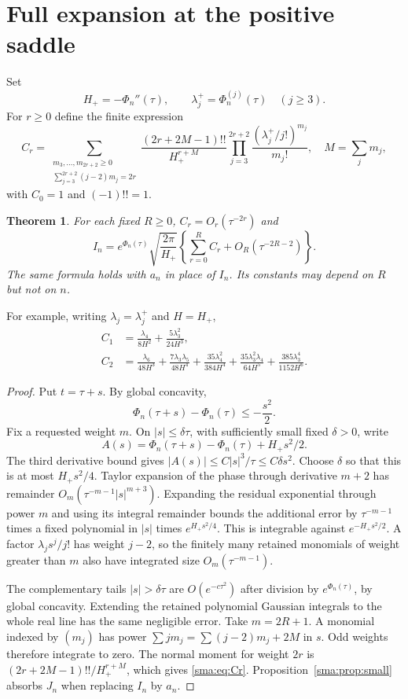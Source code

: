 \documentclass[11pt,letterpaper]{article}
\numberwithin{equation}{section}
\newtheorem{theorem}{Theorem}[section]\newtheorem{lemma}[theorem]{Lemma}\newtheorem{proposition}[theorem]{Proposition}\newtheorem{corollary}[theorem]{Corollary}\theoremstyle{remark}\newtheorem{remark}[theorem]{Remark}
\begin{document}
\section{Full expansion at the positive saddle}
Set
\[
 H_+=-\Phi_n''(\tau),\qquad \lambda_j^+=\Phi_n^{(j)}(\tau)\quad(j\ge3).
\]
For $r\ge0$ define the finite expression
\begin{equation}\label{sma:eq:Cr}
 C_r=\sum_{\substack{m_3,\ldots,m_{2r+2}\ge0\\
                  \sum_{j=3}^{2r+2}(j-2)m_j=2r}}
 \frac{(2r+2M-1)!!}{H_+^{r+M}}
 \prod_{j=3}^{2r+2}\frac{(\lambda_j^+/j!)^{m_j}}{m_j!},
 \quad M=\sum_jm_j,
\end{equation}
with $C_0=1$ and $(-1)!!=1$.
\begin{theorem}\label{sma:thm:positive}
For each fixed $R\ge0$, $C_r=O_r(\tau^{-2r})$ and
\begin{equation}\label{sma:eq:positivesaddle}
 I_n=e^{\Phi_n(\tau)}\sqrt{\frac{2\pi}{H_+}}
 \left\{\sum_{r=0}^{R}C_r+O_R(\tau^{-2R-2})\right\}.
\end{equation}
The same formula holds with $a_n$ in place of $I_n$. Its constants may depend on $R$ but not on $n$.
\end{theorem}
For example, writing $\lambda_j=\lambda_j^+$ and $H=H_+$,
\begin{align}
 C_1&=\frac{\lambda_4}{8H^2}+\frac{5\lambda_3^2}{24H^3},\label{sma:eq:C1}\\
 C_2&=\frac{\lambda_6}{48H^3}+\frac{7\lambda_3\lambda_5}{48H^4}
 +\frac{35\lambda_4^2}{384H^4}
 +\frac{35\lambda_3^2\lambda_4}{64H^5}
 +\frac{385\lambda_3^4}{1152H^6}.\label{sma:eq:C2}
\end{align}
\begin{proof}
Put $t=\tau+s$. By global concavity,
\[
 \Phi_n(\tau+s)-\Phi_n(\tau)\le-\frac{s^2}{2}.
\]
Fix a requested weight $m$. On $|s|\le\delta\tau$, with sufficiently small fixed $\delta>0$, write
\[
 A(s)=\Phi_n(\tau+s)-\Phi_n(\tau)+H_+s^2/2.
\]
The third derivative bound gives $|A(s)|\le C|s|^3/\tau\le C\delta s^2$. Choose $\delta$ so that this is at most $H_+s^2/4$. Taylor expansion of the phase through derivative $m+2$ has remainder
$O_m(\tau^{-m-1}|s|^{m+3})$. Expanding the residual exponential through power $m$ and using its integral remainder bounds the additional error by $\tau^{-m-1}$ times a fixed polynomial in $|s|$ times $e^{H_+s^2/4}$. This is integrable against $e^{-H_+s^2/2}$. A factor $\lambda_j s^j/j!$ has weight $j-2$, so the finitely many retained monomials of weight greater than $m$ also have integrated size $O_m(\tau^{-m-1})$.

The complementary tails $|s|>\delta\tau$ are $O(e^{-c\tau^2})$ after division by $e^{\Phi_n(\tau)}$, by global concavity. Extending the retained polynomial Gaussian integrals to the whole real line has the same negligible error. Take $m=2R+1$. A monomial indexed by $(m_j)$ has power $\sum j m_j=\sum(j-2)m_j+2M$ in $s$. Odd weights therefore integrate to zero. The normal moment for weight $2r$ is $(2r+2M-1)!!/H_+^{r+M}$, which gives \eqref{sma:eq:Cr}. Proposition~\ref{sma:prop:small} absorbs $J_n$ when replacing $I_n$ by $a_n$.
\end{proof}
\end{document}
